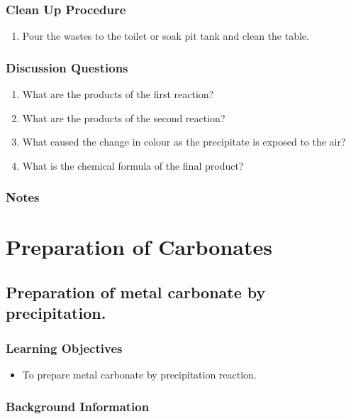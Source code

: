 \subsubsection*{Clean Up Procedure}
\begin{enumerate}
\item{Pour the wastes to the toilet or soak pit tank and clean the table.}
\end{enumerate}

\subsubsection*{Discussion Questions}
\begin{enumerate}
\item{What are the products of the first reaction?}
\item{What are the products of the second reaction?}
\item{What caused the change in colour as the precipitate is exposed to the air?}
\item{What is the chemical formula of the final product?}
\end{enumerate}

\subsubsection*{Notes}



\section{Preparation of Carbonates}

\subsection{Preparation of metal carbonate by precipitation.}

\subsubsection*{Learning Objectives}
\begin{itemize}
\item{To prepare metal carbonate by precipitation reaction.}
\end{itemize}

\subsubsection*{Background Information}


